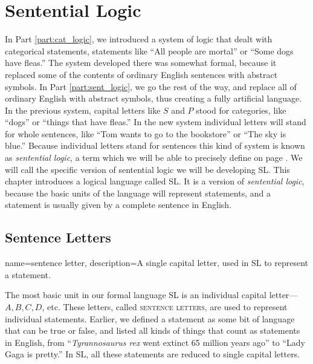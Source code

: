\chapter{Sentential Logic}
\label{chap:SL}


{In Part \ref{part:cat_logic}, we introduced a system of logic that dealt with categorical statements, statements like ``All people are mortal'' or ``Some dogs have  fleas.'' The system developed there was somewhat formal, because it replaced some of the contents of ordinary English sentences with abstract symbols. In Part \ref{part:sent_logic}, we go the rest of the way, and replace all of ordinary English with abstract symbols, thus creating a fully artificial language. In the previous system, capital letters like $S$ and $P$ stood for categories, like ``dogs'' or ``things that have fleas.'' In the new system individual letters will stand for whole sentences, like ``Tom wants to go to the bookstore'' or ``The sky is blue.'' Because individual letters stand for sentences this kind of system is known as \textit{sentential logic}, a term which we will be able to precisely define on page \pageref{def:sentential_logic}. We will call the specific version of sentential logic we will be developing SL.}%
{This chapter introduces a logical language called SL. It is a version of \emph{sentential logic}, because the basic units of the language will represent statements, and a statement is usually given by a complete sentence in English.} %








\section{Sentence Letters}


{
name=sentence letter,
description={A single capital letter, used in SL to represent a statement.}
}

The most basic unit in our formal language SL is an individual capital letter---$A, B, C, D$, etc. These letters, called \textsc{\glspl{sentence letter}}, \label{def:sentence_letter} are used to represent individual statements. Earlier, we defined a statement as some bit of language that can be true or false, and listed all kinds of things that count as statements in English, from ``\emph{Tyrannosaurus rex} went extinct 65 million years ago'' to ``Lady Gaga is pretty.'' In SL, all these statements are reduced to single capital letters.

